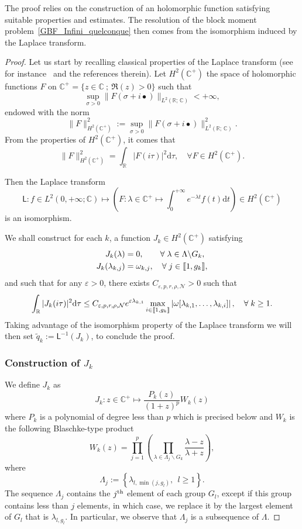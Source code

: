 \documentclass[10pt]{amsart}
\theoremstyle{definition}\newtheorem{defi}[theo]{Definition}\newtheorem{rema}[theo]{Remark}\newtheorem{exam}[theo]{Example}\newtheorem{exem}[theo]{Example}\newtheorem{nota}[theo]{Notation}
\newcommand{\llbracket}{\mathopen{[\mkern -2.7mu[}}
\newcommand{\rrbracket}{\mathclose{]\mkern -2.7mu]}}
\newcommand{\inter}[2]{\llbracket #1,#2 \rrbracket}
\newcommand{\n}{g}
\newcommand{\NN}{\mathcal{N}}
\newcommand{\R}{\mathbb{R}}
\newcommand{\C}{\mathbb{C}}
\newcommand{\md}{\mathrm{d}}
\renewcommand{\cdot}{{\scriptstyle \bullet}}
\let\oldforall\forall
\renewcommand*{\forall}{\mathrel{\oldforall}}
\begin{document}
The proof relies on the construction of an holomorphic function satisfying suitable properties and estimates. The resolution of the block moment problem~\eqref{GBF_Infini_quelconque} then comes from the isomorphism induced by the Laplace transform.
\begin{proof}
Let us start by recalling classical properties of the Laplace transform (see for instance~\cite[pp.~19-20]{SchwartzThese} and the references therein). Let $H^2(\C^+)$ the space of holomorphic functions $F$ on $\C^+ = \{ z \in \C \: ; \: \Re(z) >0 \}$ such that
\[
\sup_{\sigma >0 } \| F(\sigma + i \cdot) \|_{L^2(\R ;\,\C)} < + \infty,
\]
endowed with the norm
\[
\| F \|_{H^2(\C^+)}^2 := \sup_{\sigma >0 } \| F(\sigma + i \cdot) \|^2_{L^2(\R ;\,\C)}.
\]
From the properties of $H^2(\C^+)$, it comes that
\[
\| F \|_{H^2(\C^+)}^2 = \int_\R | F(i \tau)|^2 \md \tau, \quad \forall F \in H^2(\C^+).
\]


\goodbreak
Then the Laplace transform
\[
\mathsf{L} : f \in L^2(0,+\infty ; \C) \mapsto \left(F : \lambda \in \C^+ \mapsto \int_0^{+\infty} e^{-\lambda t } f(t) \md t \right) \in H^2(\C^+)
\]
is an isomorphism.

We shall construct for each $k$, a function $J_k \in H^2(\C^+)$ satisfying
\begin{align}\label{ProprietesJk1}
J_k(\lambda) &= 0, \qquad \forall \lambda \in \Lambda \backslash G_k,
\\
J_k(\lambda_{k,j}) &= \omega_{k,j}, \quad \forall j \in \inter{1}{\n_k},\label{ProprietesJk2}
\end{align}
and such that for any $\varepsilon >0$, there exists $C_{\varepsilon, p, r, \rho, \NN}>0$ such that
\[
\int_\R | J_k(i \tau)|^2 \md \tau \leq C_{\varepsilon, p, r, \rho, \NN} e^{\varepsilon \lambda_{k,1}} \max \limits_{i\in \inter{1}{\n_k}} \left| \omega[\lambda_{k,1}, \dots, \lambda_{k,i}] \right|, \quad \forall k \geq 1.
\]
Taking advantage of the isomorphism property of the Laplace transform we will then set $\widetilde{q}_k := \mathsf{L}^{-1} (J_k)$, to conclude the proof.


\subsubsection{Construction of $J_k$}
We define $J_k$ as
\begin{equation*}\label{Forme_Jk}
J_k : z \in \C^+ \mapsto \frac{P_k(z)}{(1+z)^p} W_k(z)
\end{equation*}
where $P_k$ is a polynomial of degree less than $p$ which is precised below and $W_k$ is the following Blaschke-type product
\[
W_k(z) = \prod_{j=1}^p \left(\prod_{\lambda \in \Lambda_j \backslash G_k} \frac{\lambda-z}{\lambda+z}\right),
\]
where
\begin{equation}\label{def_Lambda_j}
\Lambda_j:=\left\{\lambda_{l,\min(j,\n_l)},\ \ l\geq 1\right\}.
\end{equation}
The sequence $\Lambda_j$ contains the $j^{\rm th}$ element of each group $G_l$, except if this group contains less than $j$ elements, in which case, we replace it by the largest element of $G_l$ that is $\lambda_{l,\n_l}$. In particular, we observe that $\Lambda_j$ is a subsequence of $\Lambda$.



\end{proof}
\end{document}
